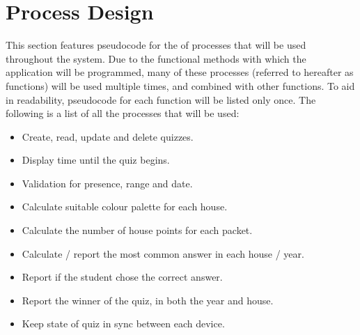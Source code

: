 \section{Process Design}
This section features pseudocode for the of processes that will be used throughout the system. Due to the functional methods with which the application will be programmed, many of these processes (referred to hereafter as functions) will be used multiple times, and combined with other functions. To aid in readability, pseudocode for each function will be listed only once. The following is a list of all the processes that will be used:

\begin{itemize}
\item Create, read, update and delete quizzes.
\item Display time until the quiz begins.
\item Validation for presence, range and date.
\item Calculate suitable colour palette for each house.
\item Calculate the number of house points for each packet.
\item Calculate / report the most common answer in each house / year.
\item Report if the student chose the correct answer.
\item Report the winner of the quiz, in both the year and house.
\item Keep state of quiz in sync between each device.
\end{itemize}






